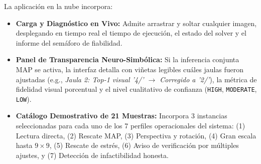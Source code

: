 La aplicaci\'on en la nube incorpora:
\begin{itemize}
    \item \textbf{Carga y Diagn\'ostico en Vivo:} Admite arrastrar y soltar cualquier imagen, desplegando en tiempo real el tiempo de ejecuci\'on, el estado del solver y el informe del sem\'aforo de fiabilidad.
    \item \textbf{Panel de Transparencia Neuro-Simb\'olica:} Si la inferencia conjunta MAP se activa, la interfaz detalla con vi\~netas legibles cu\'ales jaulas fueron ajustadas (e.g., \textit{Jaula 2: Top-1 visual '4/' $\to$ Corregido a '2/'}), la m\'etrica de fidelidad visual porcentual y el nivel cualitativo de confianza (\texttt{HIGH}, \texttt{MODERATE}, \texttt{LOW}).
    \item \textbf{Cat\'alogo Demostrativo de 21 Muestras:} Incorpora 3 instancias seleccionadas para cada uno de los 7 perfiles operacionales del sistema: (1) Lectura directa, (2) Rescate MAP, (3) Perspectiva y rotaci\'on, (4) Gran escala hasta $9\times9$, (5) Rescate de estr\'es, (6) Aviso de verificaci\'on por m\'ultiples ajustes, y (7) Detecci\'on de infactibilidad honesta.
\end{itemize}
